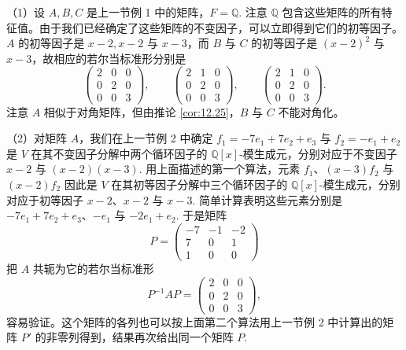 \begin{example}
（1）设 \(A, B, C\) 是上一节例 1 中的矩阵，\(F = \mathbb{Q}\). 注意 \(\mathbb{Q}\) 包含这些矩阵的所有特征值。由于我们已经确定了这些矩阵的不变因子，可以立即得到它们的初等因子。\(A\) 的初等因子是 \(x-2, x-2\) 与 \(x-3\)，而 \(B\) 与 \(C\) 的初等因子是 \((x-2)^2\) 与 \(x-3\)，故相应的若尔当标准形分别是
\[
\begin{pmatrix} 2 & 0 & 0 \\ 0 & 2 & 0 \\ 0 & 0 & 3 \end{pmatrix}, \qquad \begin{pmatrix} 2 & 1 & 0 \\ 0 & 2 & 0 \\ 0 & 0 & 3 \end{pmatrix}, \qquad \begin{pmatrix} 2 & 1 & 0 \\ 0 & 2 & 0 \\ 0 & 0 & 3 \end{pmatrix}.
\]
注意 \(A\) 相似于对角矩阵，但由推论 \ref{cor:12.25}，\(B\) 与 \(C\) 不能对角化。

（2）对矩阵 \(A\)，我们在上一节例 2 中确定 \(f_1 = -7e_1+7e_2+e_3\) 与 \(f_2 = -e_1+e_2\) 是 \(V\) 在其不变因子分解中两个循环因子的 \(\mathbb{Q}[x]\)-模生成元，分别对应于不变因子 \(x-2\) 与 \((x-2)(x-3)\). 用上面描述的第一个算法，元素 \(f_1\)、\((x-3)f_2\) 与 \((x-2)f_2\) 因此是 \(V\) 在其初等因子分解中三个循环因子的 \(\mathbb{Q}[x]\)-模生成元，分别对应于初等因子 \(x-2\)、\(x-2\) 与 \(x-3\). 简单计算表明这些元素分别是 \(-7e_1+7e_2+e_3\)、\(-e_1\) 与 \(-2e_1+e_2\). 于是矩阵
\[
P = \begin{pmatrix} -7 & -1 & -2 \\ 7 & 0 & 1 \\ 1 & 0 & 0 \end{pmatrix}
\]
把 \(A\) 共轭为它的若尔当标准形
\[
P^{-1}AP = \begin{pmatrix} 2 & 0 & 0 \\ 0 & 2 & 0 \\ 0 & 0 & 3 \end{pmatrix},
\]
容易验证。这个矩阵的各列也可以按上面第二个算法用上一节例 2 中计算出的矩阵 \(P'\) 的非零列得到，结果再次给出同一个矩阵 \(P\).


\end{example}
